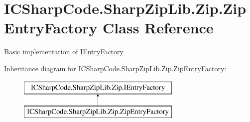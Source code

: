 \hypertarget{class_i_c_sharp_code_1_1_sharp_zip_lib_1_1_zip_1_1_zip_entry_factory}{}\section{I\+C\+Sharp\+Code.\+Sharp\+Zip\+Lib.\+Zip.\+Zip\+Entry\+Factory Class Reference}
\label{class_i_c_sharp_code_1_1_sharp_zip_lib_1_1_zip_1_1_zip_entry_factory}


Basic implementation of \hyperlink{interface_i_c_sharp_code_1_1_sharp_zip_lib_1_1_zip_1_1_i_entry_factory}{I\+Entry\+Factory}  


Inheritance diagram for I\+C\+Sharp\+Code.\+Sharp\+Zip\+Lib.\+Zip.\+Zip\+Entry\+Factory\+:\begin{figure}[H]
\begin{center}
\leavevmode
\includegraphics[height=2.000000cm]{class_i_c_sharp_code_1_1_sharp_zip_lib_1_1_zip_1_1_zip_entry_factory}
\end{center}
\end{figure}
